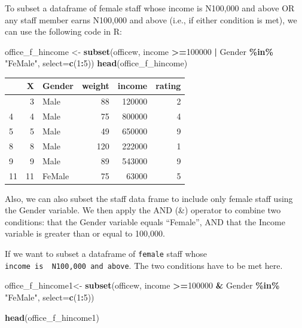 \documentclass[
]{article}
\newenvironment{Shaded}{\begin{snugshade}}{\end{snugshade}}
\newcommand{\AttributeTok}[1]{\textcolor[rgb]{0.13,0.29,0.53}{#1}}
\newcommand{\DecValTok}[1]{\textcolor[rgb]{0.00,0.00,0.81}{#1}}
\newcommand{\FunctionTok}[1]{\textcolor[rgb]{0.13,0.29,0.53}{\textbf{#1}}}
\newcommand{\NormalTok}[1]{#1}
\newcommand{\OtherTok}[1]{\textcolor[rgb]{0.56,0.35,0.01}{#1}}
\newcommand{\SpecialCharTok}[1]{\textcolor[rgb]{0.81,0.36,0.00}{\textbf{#1}}}
\newcommand{\StringTok}[1]{\textcolor[rgb]{0.31,0.60,0.02}{#1}}
\begin{document}
To subset a dataframe of female staff whose income is N100,000 and above
OR any staff member earns N100,000 and above (i.e., if either condition
is met), we can use the following code in R:

\begin{Shaded}
\begin{Highlighting}[]
\NormalTok{office\_f\_hincome }\OtherTok{\textless{}{-}} \FunctionTok{subset}\NormalTok{(officew, income }\SpecialCharTok{\textgreater{}=}\DecValTok{100000} \SpecialCharTok{|}\NormalTok{ Gender }\SpecialCharTok{\%in\%} \StringTok{"FeMale"}\NormalTok{,}
                  \AttributeTok{select=}\FunctionTok{c}\NormalTok{(}\DecValTok{1}\SpecialCharTok{:}\DecValTok{5}\NormalTok{))}
\FunctionTok{head}\NormalTok{(office\_f\_hincome)}
\end{Highlighting}
\end{Shaded}

\begin{longtable}[]{@{}lrlrrr@{}}
\toprule\noalign{}
& X & Gender & weight & income & rating \\
\midrule\noalign{}
\endhead
\bottomrule\noalign{}
\endlastfoot
3 & 3 & Male & 88 & 120000 & 2 \\
4 & 4 & Male & 75 & 800000 & 4 \\
5 & 5 & Male & 49 & 650000 & 9 \\
8 & 8 & Male & 120 & 222000 & 1 \\
9 & 9 & Male & 89 & 543000 & 9 \\
11 & 11 & FeMale & 75 & 63000 & 5 \\
\end{longtable}

Also, we can also subset the staff data frame to include only female
staff using the Gender variable. We then apply the AND (\&) operator to
combine two conditions: that the Gender variable equals ``Female'', AND
that the Income variable is greater than or equal to 100,000.

If we want to subset a dataframe of \texttt{female} staff whose
\texttt{income\ is\ \ N100,000\ and\ above}. The two conditions have to
be met here.

\begin{Shaded}
\begin{Highlighting}[]
\NormalTok{office\_f\_hincome1}\OtherTok{\textless{}{-}} \FunctionTok{subset}\NormalTok{(officew, income }\SpecialCharTok{\textgreater{}=}\DecValTok{100000} \SpecialCharTok{\&}\NormalTok{ Gender }\SpecialCharTok{\%in\%} \StringTok{"FeMale"}\NormalTok{,}
                  \AttributeTok{select=}\FunctionTok{c}\NormalTok{(}\DecValTok{1}\SpecialCharTok{:}\DecValTok{5}\NormalTok{))}

\FunctionTok{head}\NormalTok{(office\_f\_hincome1)}
\end{Highlighting}
\end{Shaded}
\end{document}
